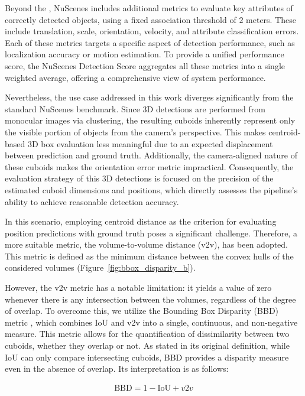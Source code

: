 Beyond the , NuScenes includes additional metrics to evaluate key attributes of correctly detected objects, using a fixed association threshold of $2$ meters. These include translation, scale, orientation, velocity, and attribute classification errors. Each of these metrics targets a specific aspect of detection performance, such as localization accuracy or motion estimation. To provide a unified performance score, the NuScenes Detection Score aggregates all these metrics into a single weighted average, offering a comprehensive view of system performance.

Nevertheless, the use case addressed in this work diverges significantly from the standard NuScenes benchmark. Since 3D detections are performed from monocular images via clustering, the resulting cuboids inherently represent only the visible portion of objects from the camera's perspective. This makes centroid-based 3D box evaluation less meaningful due to an expected displacement between prediction and ground truth. Additionally, the camera-aligned nature of these cuboids makes the orientation error metric impractical. Consequently, the evaluation strategy of this 3D detections is focused on the precision of the estimated cuboid dimensions and positions, which directly assesses the pipeline's ability to achieve reasonable detection accuracy.

In this scenario, employing centroid distance as the criterion for evaluating position predictions with ground truth poses a significant challenge. Therefore, a more suitable metric, the volume-to-volume distance (v2v), has been adopted. This metric is defined as the minimum distance between the convex hulls of the considered volumes (Figure~\ref{fig:bbox_disparity_b}).

However, the v2v metric has a notable limitation: it yields a value of zero whenever there is any intersection between the volumes, regardless of the degree of overlap. To overcome this, we utilize the Bounding Box Disparity (BBD) metric \cite{bounding_box_disparity}, which combines IoU and v2v into a single, continuous, and non-negative measure. This metric allows for the quantification of dissimilarity between two cuboids, whether they overlap or not. As stated in its original definition, while IoU can only compare intersecting cuboids, BBD provides a disparity measure even in the absence of overlap. Its interpretation is as follows:

\begin{equation}
    \begin{aligned}
    \text{BBD} = 1 - \text{IoU} + v2v
    \end{aligned}
    \label{eq:3d_metrics}
\end{equation}

